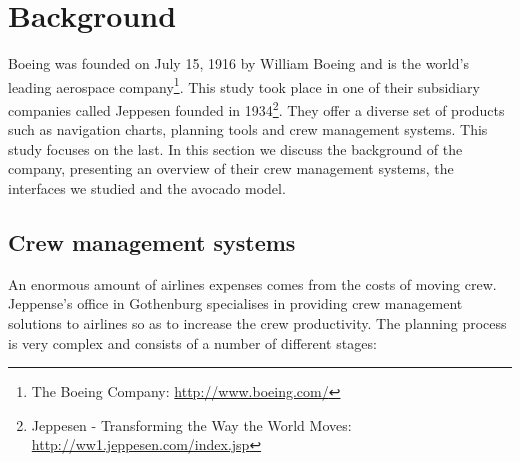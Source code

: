\section{Background}

Boeing was founded on July 15, 1916 by William Boeing and is the world's leading aerospace company\footnote{The Boeing Company: \url{http://www.boeing.com/}}. %
This study took place in one of their subsidiary companies called Jeppesen founded in 1934\footnote{Jeppesen - Transforming the Way the World Moves: \url{http://ww1.jeppesen.com/index.jsp}}. They offer a diverse set of products such as navigation charts, planning tools and crew management systems. This study focuses on the last. In this section we discuss the background of the company, presenting an overview of their crew management systems, the interfaces we studied and the avocado model.

\subsection{Crew management systems}

An enormous amount of airlines expenses comes from the costs of moving crew. Jeppense's office in Gothenburg specialises in providing crew management solutions to airlines so as to increase the crew productivity. The planning process is very complex and consists of a number of different stages:


